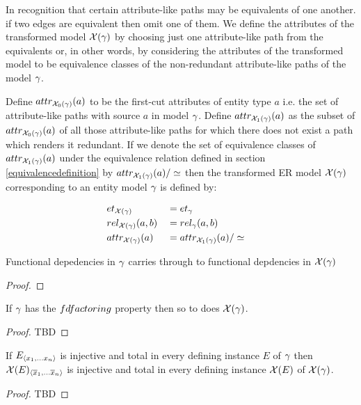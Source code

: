 In recognition that certain attribute-like paths may be equivalents of one another. if two edges are equivalent then omit one of them.
We define the attributes of the transformed model $\genericphysical$ by choosing just one attribute-like path
from the equivalents or, in other words, by considering the attributes of the transformed model to
be equivalence classes of the non-redundant  attribute-like paths of the model $\genericmodel$.

Define $\attr[\chiZeroM]{a}$ to be the first-cut attributes of entity type $a$ i.e. the set of attribute-like paths with source $a$ in model $\genericmodel$. Define $\attr[\chiOneM]{a}$
as the subset of $\attr[\chiZeroM]{a}$ of all those attribute-like paths for which there does not exist
a path which renders it redundant. If we denote the set of equivalence classes of $\attr[\chiOneM]{a}$
under the equivalence relation defined in section \ref{equivalencedefinition} by $\attr[\chiOneM]{a}/\simeq$
then the transformed ER model $\genericphysical$ corresponding to an entity 
model $\genericmodel$ is defined by:

\begin{align}
&\et[\genericphysical]        && = \et        && \\
&\rel[\genericphysical]{a}{b} && = \rel{a}{b}  &&\\
&\attr[\genericphysical]{a}   && =  \attr[\chiOneM]{a}/\simeq
\end{align}


\begin{lemma}
\label{fdcarrythroughlemma}
Functional depedencies in $\genericmodel$ carries through to functional depdencies in $\genericphysical$ 
\end{lemma}
\begin{proof}

\end{proof}

\begin{lemma}
\label{fdfactoringcarrythroughlemma}
If  $\genericmodel$ has the $\fdfactoring$ property then so to does $\genericphysical$. 
\end{lemma}
\begin{proof}
TBD
\end{proof}

\begin{lemma}
\label{injectivecarrythroughlemma}
If $E_{\tuple{x_1,...x_n }}$ is
injective and total in every defining instance $E$ of $\genericmodel$ then $\logtophys(E)_{\tuple{\phys{x}_1,...\phys{x}_n }}$ is
injective and total in every defining instance $\logtophys(E)$ of $\genericphysical$.
\end{lemma}
\begin{proof}
TBD
\end{proof}


